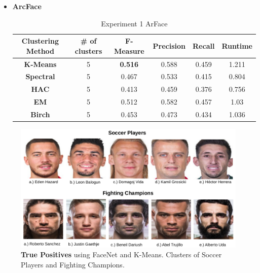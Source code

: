 \documentclass[12pt,english]{article}
\begin{document}
\begin{itemize}
\item \textbf{ArcFace}
\begin{table}[H]
\centering
\begin{tabular}{||c c c c c c||} 
 \hline
 Clustering Method & \# of clusters & F-Measure & Precision & Recall & Runtime\\ [0.5ex]
 \hline\hline
 \textbf{K-Means} & 5 & \textbf{0.516} & 0.588 & 0.459 & 1.211\\ 
 \hline
  \textbf{Spectral} & 5 & 0.467 & 0.533 & 0.415 & 0.804\\
 \hline
 \textbf{HAC} & 5 & 0.413 & 0.459 & 0.376 & 0.756\\
 \hline
 \textbf{EM} & 5 & 0.512 & 0.582 & 0.457 & 1.03\\
 \hline
 \textbf{Birch} & 5 & 0.453 & 0.473 & 0.434 & 1.036\\
 \hline
\end{tabular}
\caption{Experiment 1 ArFace}
\label{table:ex1arcface}
\end{table}

\end{itemize}


\begin{figure}[H]
 \centering
    \includegraphics[width=\columnwidth]{figures/soccer_tp.png}
    \caption{\textbf{True Positives} using FaceNet and K-Means. Clusters of Soccer Players and Fighting Champions.}
    \label{fig:ex1tp}
\end{figure}
\end{document}
